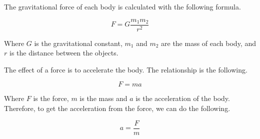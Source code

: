 \documentclass{article}
\begin{document}
The gravitational force of each body is calculated with the following formula.

\begin{displaymath}
    F = G \frac{m_1m_2}{r^2}
\end{displaymath}

Where \(G\) is the gravitational constant, \(m_1\) and \(m_2\) are the mass of
each body, and \(r\) is the distance between the objects.

The effect of a force is to accelerate the body. The relationship is the
following.

\begin{displaymath}
   F = m a
\end{displaymath}

Where \(F\) is the force, \(m\) is the mass and \(a\) is the acceleration of
the body. Therefore, to get the acceleration from the force, we can do the
following.

\begin{displaymath}
    a = \frac{F}{m}
\end{displaymath}
\end{document}
